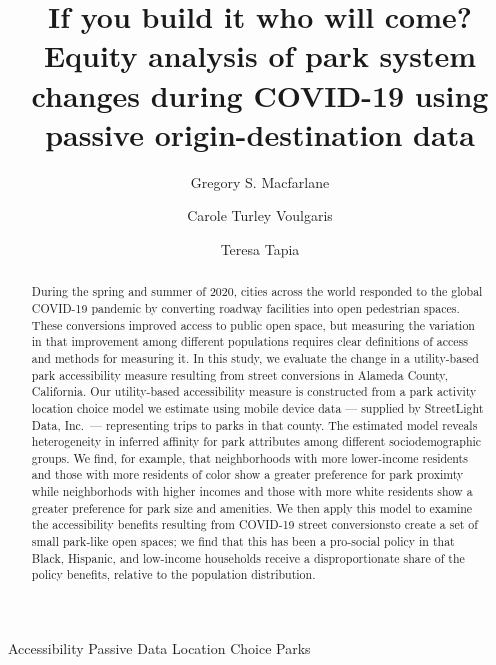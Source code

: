 \documentclass[3p, authoryear, review]{elsarticle} %
\begin{document}
\begin{frontmatter}

  \title{If you build it who will come? Equity analysis of park system changes during COVID-19 using passive origin-destination data}
    \author[BYU]{Gregory S. Macfarlane}
    \author[Harvard]{Carole Turley Voulgaris}
    \author[StreetLight]{Teresa Tapia}
      \address[BYU]{Brigham Young University, Civil and Environmental Engineering Department, 430 Engineering Building, Provo, Utah 84602}
    \address[Harvard]{Harvard Graduate School of Design, 48 Quincy St, Cambridge, Massachussetts 02138}
    \address[StreetLight]{StreetLight Data, Inc., San Francisco, California}
  
  \begin{abstract}
  During the spring and summer of 2020, cities across the world responded to the global COVID-19 pandemic by converting roadway facilities into open pedestrian spaces. These conversions improved access to public open space, but measuring the variation in that improvement among different populations requires clear definitions of access and methods for measuring it. In this study, we evaluate the change in a utility-based park accessibility measure resulting from street conversions in Alameda County, California. Our utility-based accessibility measure is constructed from a park activity location choice model we estimate using mobile device data --- supplied by StreetLight Data, Inc.~--- representing trips to parks in that county. The estimated model reveals heterogeneity in inferred affinity for park attributes among different sociodemographic groups. We find, for example, that neighborhoods with more lower-income residents and those with more residents of color show a greater preference for park proximty while neighborhods with higher incomes and those with more white residents show a greater preference for park size and amenities. We then apply this model to examine the accessibility benefits resulting from COVID-19 street conversionsto create a set of small park-like open spaces; we find that this has been a pro-social policy in that Black, Hispanic, and low-income households receive a disproportionate share of the policy benefits, relative to the population distribution.
  \end{abstract}
   \begin{keyword} Accessibility Passive Data Location Choice Parks\end{keyword}
 \end{frontmatter}
\end{document}
